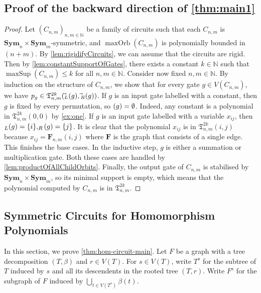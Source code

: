 \documentclass[11pt, DIV=15]{scrarticle}
\theoremstyle{definition}
\theoremstyle{plain}
\theoremstyle{remark}
\newcommand{\Sym}{\mathbf{Sym}}
\newcommand{\bbN}{\mathbb{N}}
\let\sup\relax
\DeclareMathOperator{\sup}{sup}
\DeclareMathOperator{\maxOrb}{maxOrb}
\DeclareMathOperator{\maxSup}{maxSup}
\begin{document}
 	
 	\subsection{Proof of the backward direction of \cref{thm:main1}}
 	\begin{proof}
 		Let $(C_{n,m})_{n,m \in \bbN}$ be a family of circuits such that each $C_{n,m}$ is $\Sym_n \times \Sym_m$-symmetric, and $\maxOrb(C_{n,m})$ is polynomially bounded in $(n+m)$. By \cref{lem:rigidifyCircuits}, we can assume that the circuits are rigid. Then by \cref{lem:constantSupportOfGates}, there exists a constant $k \in \bbN$ such that $\maxSup(C_{n,m}) \leq k$ for all $n,m \in \bbN$. Consider now fixed $n, m \in \bbN$.
 		By induction on the structure of $C_{n,m}$, we show
                that for every gate $g \in V(C_{n,m})$, we have $p_g \in \mathfrak{T}^{2k}_{n,m}(\vec{\sup}_L(g), \vec{\sup}_R(g))$. If $g$ is an input gate labelled with a constant, then $g$ is fixed by every permutation, so $\sup(g) = \emptyset$. Indeed, any constant is a polynomial in $ \mathfrak{T}^{2k}_{n,m}(0, 0)$ by \cref{ex:one}. If $g$ is an input gate labelled with a variable $x_{ij}$, then $\sup_L(g) = \{i\}, \sup_R(g) = \{j\}$. It is clear that the polynomial $x_{ij}$ is in $\mathfrak{T}^{2k}_{n,m}(i, j)$ because $x_{ij} = \boldsymbol{F}_{n,m}(i,j)$ where $\boldsymbol{F}$ is the graph that consists of a single edge. This finishes the base cases. 
 		In the inductive step, $g$ is either a summation or multiplication gate. Both these cases are handled by \cref{lem:productOfAllChildOrbits}. Finally, the output gate of $C_{n,m}$ is stabilised by $\Sym_n \times \Sym_m$, so its minimal support is empty, which means that the polynomial computed by $C_{n,m}$ is in $\mathfrak{T}^{2k}_{n,m}$. 
 	\end{proof}	
 	
 	
 	
 	
 	
 	
 	
 	\subsection{Symmetric Circuits for Homomorphism Polynomials}
 	In this section, we prove \cref{thm:hom-circuit-main}. 	
 	Let $F$ be a graph with a tree decomposition $(T, \beta)$ and $r \in V(T)$.
 	For $s \in V(T)$, write $T^s$ for the subtree of $T$ induced by $s$ and all its descendents in the rooted tree $(T, r)$.
 	Write $F^s$ for the subgraph of $F$ induced by $\bigcup_{t \in V(T^s)} \beta(t)$.
 	
\end{document}

